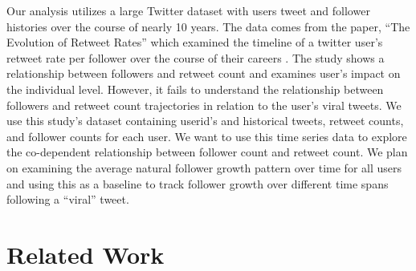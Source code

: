 \documentclass[twoside,twocolumn]{article}
\begin{document}
Our analysis utilizes a large Twitter dataset with users tweet and follower histories over the course of nearly 10 years. The data comes from the paper, “The Evolution of Retweet Rates” which examined the timeline of a twitter user’s retweet rate per follower over the course of their careers \cite{6}. The study shows a relationship between followers and retweet count and examines user’s impact on the individual level. However, it fails to understand the relationship between followers and retweet count trajectories in relation to the user’s viral tweets. We use this study’s dataset containing userid’s and historical tweets, retweet counts, and follower counts for each user. We want to use this time series data to explore the co-dependent relationship between follower count and retweet count. We plan on examining the average natural follower growth pattern over time for all users and using this as a baseline to track follower growth over different time spans following a “viral” tweet.

\section{Related Work}



\end{document}
